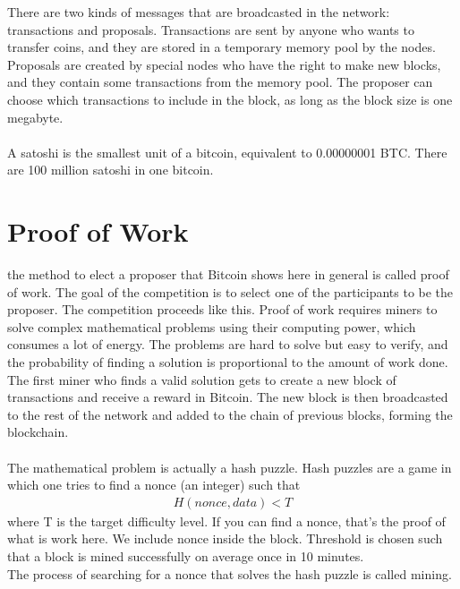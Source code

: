 There are two kinds of messages that are broadcasted in the network: transactions and proposals. Transactions are sent by anyone who wants to transfer coins, and they are stored in a temporary memory pool by the nodes. Proposals are created by special nodes who have the right to make new blocks, and they contain some transactions from the memory pool. The proposer can choose which transactions to include in the block, as long as the block size is one megabyte.\\\\
A satoshi is the smallest unit of a bitcoin, equivalent to 0.00000001 BTC. There are 100 million satoshi in one bitcoin.

\section{Proof of Work}
the method to elect a proposer that Bitcoin shows here in general is called proof of work. The goal of the competition is to select one of the participants to be the proposer.  The competition proceeds like this.  Proof of work requires miners to solve complex mathematical problems using their computing power, which consumes a lot of energy. The problems are hard to solve but easy to verify, and the probability of finding a solution is proportional to the amount of work done. The first miner who finds a valid solution gets to create a new block of transactions and receive a reward in Bitcoin. The new block is then broadcasted to the rest of the network and added to the chain of previous blocks, forming the blockchain.\\\\
The mathematical problem is actually a hash puzzle. Hash puzzles are a game in which one tries to find a nonce (an integer) such that 
\begin{align*}
	H(nonce, data) < T
\end{align*}
where T is the target difficulty level. If you can find a nonce, that's the proof of what is work here. We include nonce inside the block. Threshold is chosen such that a block is mined successfully on average once in 10 minutes.\\
The process of searching for a nonce that solves the hash puzzle is called mining.
